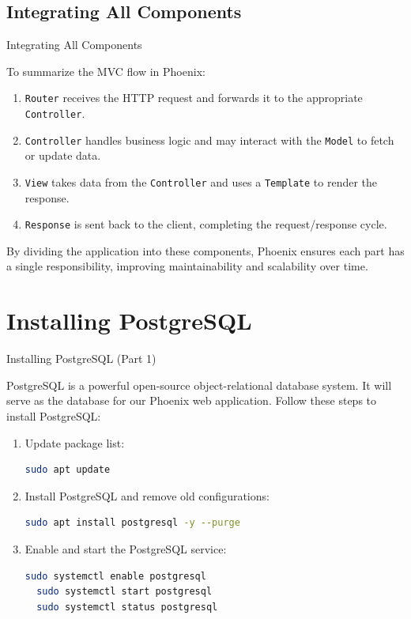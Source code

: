 \documentclass[aspectratio=169, table]{beamer}
\begin{document}
\subsection{Integrating All Components}

\begin{frame}[fragile]{Integrating All Components}
\vspace{20pt}

To summarize the MVC flow in Phoenix:

\begin{enumerate}
  \item \texttt{Router} receives the HTTP request and forwards it to the appropriate \texttt{Controller}.
  \item \texttt{Controller} handles business logic and may interact with the \texttt{Model} to fetch or update data.
  \item \texttt{View} takes data from the \texttt{Controller} and uses a \texttt{Template} to render the response.
  \item \texttt{Response} is sent back to the client, completing the request/response cycle.
\end{enumerate}

By dividing the application into these components, Phoenix ensures each part has a single responsibility, improving maintainability and scalability over time.
\end{frame}


\section{Installing PostgreSQL}

\begin{frame}[fragile]{Installing PostgreSQL (Part 1)}
\vspace{20pt}

PostgreSQL is a powerful open-source object-relational database system.  
It will serve as the database for our Phoenix web application.  
Follow these steps to install PostgreSQL:

\begin{enumerate}
  \item Update package list:
  \begin{lstlisting}[language=bash]
  sudo apt update
  \end{lstlisting}

  \item Install PostgreSQL and remove old configurations:
  \begin{lstlisting}[language=bash]
  sudo apt install postgresql -y --purge
  \end{lstlisting}

  \item Enable and start the PostgreSQL service:
  \begin{lstlisting}[language=bash]
  sudo systemctl enable postgresql
  sudo systemctl start postgresql
  sudo systemctl status postgresql
  \end{lstlisting}
\end{enumerate}
\end{frame}
\end{document}

